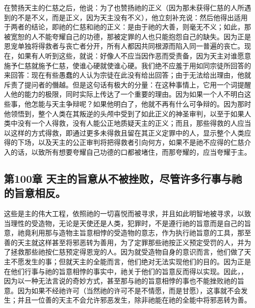 在赞扬天主的仁慈之后，他说：为了也赞扬祂的正义（因为那未获得仁慈的人所遇到的不是不义，而是正义，因为天主没有不义），他立刻补充说：然后他得出适用于两者的结论，即祂的仁慈和祂的正义：是由于祂的大善，则毫无不义；如此，那被宽恕的人不能夸耀自己的功德，那被定罪的人也只能抱怨自己的缺失。因为正是恩宠单独将得救者与丧亡者分开，所有人都因共同根源而陷入同一普遍的丧亡。现在，如果有人听到这些，就说：好像人不应当因作恶而受责备，因为天主对谁愿意施予仁慈就施予仁慈，使谁心硬就使谁心硬。我们绝不应羞于用如同宗徒所回答的来回答：现在有些愚蠢的人认为宗徒在此没有给出回答；由于无法给出理由，他就斥责了提问者的僭越。但是这句话有极大的分量：在这种事情上，它用一个词提醒人他的能力的极限，同时实际上传达了一个重要的理由。因为如果一个人不明白这些事，他怎能与天主争辩呢？如果他明白了，他就不再有什么可争辩的。因为那时他领悟到，整个人类在其叛逆的头颅中受到了如此正义的神圣审判，以至于如果人类中没有一个人得救，没有人能公正地质疑天主的正义；而且，那些得救的人应当以这样的方式得救，即通过更多未得救且留在其正义定罪中的人，显示整个人类应得的下场，以及天主的公正审判将把得救者引向何方，如果不是祂不应得的仁慈介入的话，以致所有想要夸耀自己功德的口都被堵住，而那夸耀的，应当夸耀于主。\par


\subsection{第100章 天主的旨意从不被挫败，尽管许多行事与祂的旨意相反。}

这些是主的伟大工程，依照祂的一切喜悦而被寻求，并且如此明智地被寻求，以致当理性的受造物，无论是天使还是人类，犯罪时，不是遵行祂的旨意而是自己的旨意，祂竟利用那与造物主旨意相悖的受造物的意志，作为执行祂旨意的工具，那至善的天主就这样甚至将邪恶转为善用，为了定罪那些祂按正义预定受罚的人，并为了拯救那些祂按仁慈预定得恩宠的人。因为就受造物自身的意识而言，他们做了天主不愿发生的事；但就天主的全能而言，他们绝对无法实现他们的目的。因为正是在他们行事与祂的旨意相悖的事实中，祂关于他们的旨意反而得以实现。因此，，因为以一种无法言说的奇妙方式，甚至那与祂的旨意相悖的事也不能挫败祂的旨意。因为如果不经祂许可（当然祂的许可不是不情愿，而是甘愿），这事就不会发生；并且一位善的天主不会允许邪恶发生，除非祂能在祂的全能中将邪恶转为善。\par

